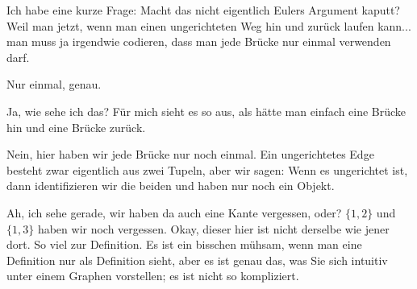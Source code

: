 \begin{student-interaction}[Studentenfrage]
Ich habe eine kurze Frage: Macht das nicht eigentlich Eulers Argument kaputt? Weil man jetzt, wenn man einen ungerichteten Weg hin und zurück laufen kann... man muss ja irgendwie codieren, dass man jede Brücke nur einmal verwenden darf.
\end{student-interaction}

\begin{spoken-clean}[00:20:32 - 00:21:11]
Nur einmal, genau.
\end{spoken-clean}

\begin{student-interaction}
Ja, wie sehe ich das? Für mich sieht es so aus, als hätte man einfach eine Brücke hin und eine Brücke zurück.
\end{student-interaction}

\begin{spoken-clean}[00:21:11 - 00:22:54]
Nein, hier haben wir jede Brücke nur noch einmal. Ein ungerichtetes Edge besteht zwar eigentlich aus zwei Tupeln, aber wir sagen: Wenn es ungerichtet ist, dann identifizieren wir die beiden und haben nur noch ein Objekt.

Ah, ich sehe gerade, wir haben da auch eine Kante vergessen, oder? $\{1, 2\}$ und $\{1, 3\}$ haben wir noch vergessen. Okay, dieser hier ist nicht derselbe wie jener dort. So viel zur Definition. Es ist ein bisschen mühsam, wenn man eine Definition nur als Definition sieht, aber es ist genau das, was Sie sich intuitiv unter einem Graphen vorstellen; es ist nicht so kompliziert.
\end{spoken-clean}

\begin{math-stroke}

\end{math-stroke}

